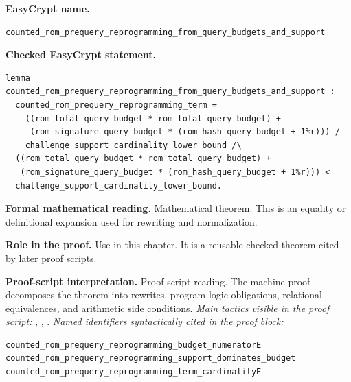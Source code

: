 \begin{formaltheorem}
\noindent\textbf{EasyCrypt name.}
\begin{lstlisting}[language=EasyCrypt,basicstyle=\ttfamily\scriptsize]
counted_rom_prequery_reprogramming_from_query_budgets_and_support
\end{lstlisting}
\noindent\textbf{Checked EasyCrypt statement.}
\begin{lstlisting}[language=EasyCrypt,basicstyle=\ttfamily\scriptsize]
lemma counted_rom_prequery_reprogramming_from_query_budgets_and_support :
  counted_rom_prequery_reprogramming_term =
    ((rom_total_query_budget * rom_total_query_budget) +
     (rom_signature_query_budget * (rom_hash_query_budget + 1%r))) /
    challenge_support_cardinality_lower_bound /\
  ((rom_total_query_budget * rom_total_query_budget) +
   (rom_signature_query_budget * (rom_hash_query_budget + 1%r))) <
  challenge_support_cardinality_lower_bound.
\end{lstlisting}
\noindent\textbf{Formal mathematical reading.}
Mathematical theorem. This is an equality or definitional expansion used for rewriting and normalization.

\noindent\textbf{Role in the proof.}
Use in this chapter. It is a reusable checked theorem cited by later proof scripts.

\noindent\textbf{Proof-script interpretation.}
Proof-script reading. The machine proof decomposes the theorem into rewrites, program-logic obligations, relational equivalences, and arithmetic side conditions.
\emph{Main tactics visible in the proof script:} \ec{split}, \ec{apply}, \ec{rewrite}.
\emph{Named identifiers syntactically cited in the proof block:}
\begin{lstlisting}[language=EasyCrypt,basicstyle=\ttfamily\scriptsize]
counted_rom_prequery_reprogramming_budget_numeratorE
counted_rom_prequery_reprogramming_support_dominates_budget
counted_rom_prequery_reprogramming_term_cardinalityE
\end{lstlisting}

\end{formaltheorem}

